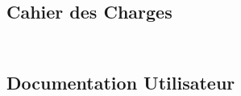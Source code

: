 \begin{appendices}
\chapter{}
\section{\\Cahier des Charges} \label{App:AppendixA}



\newpage
\section{\\Documentation Utilisateur} \label{App:AppendixB}



\end{appendices}